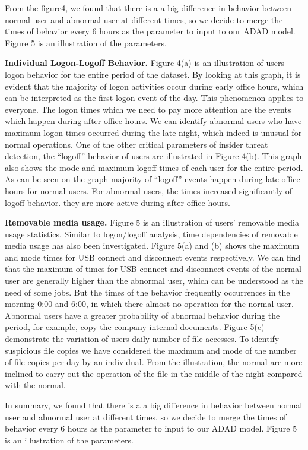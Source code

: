 \documentclass[conference]{IEEEtran}
\begin{document}
From the figure4, we found that there is a a big difference in behavior between normal user and abnormal user at different times, so we decide to merge the times of behavior every 6 hours as the parameter to input to our ADAD model. Figure 5 is an illustration of the parameters.

\iffalse
\textbf{Individual Logon-Logoff Behavior.} Figure 4(a) is an illustration of users logon behavior for the
entire period of the dataset. By looking at this graph, it is evident that the majority of logon activities occur during early office hours, which can be interpreted as the first logon event of the day. This phenomenon applies to everyone.  The logon times which we need to pay more attention are the events which happen during after office hours. We can identify abnormal users who have maximum logon times occurred during the late night, which indeed is unusual for normal operations. One of the other critical parameters of insider threat detection, the “logoff” behavior of users are illustrated in Figure 4(b). This graph also shows the mode and maximum logoff times of each user for the entire period. As can be seen on the graph majority of “logoff” events happen during late office hours for normal users. For abnormal users, the times increased significantly of logoff behavior. they are more active during after office hours.

\textbf{Removable media usage.} Figure 5 is an illustration of users’ removable media usage statistics.
Similar to logon/logoff analysis, time dependencies of removable media usage has also been investigated. Figure 5(a) and (b) shows the maximum and mode times for USB connect and disconnect events respectively. We can find that the maximum of times for USB connect and disconnect events of the normal user are generally higher than the abnormal user, which can be understood as the need of some jobs. But the times of the behavior frequently occurrences in the morning 0:00 and 6:00, in which  there almost no operation for the normal user.  Abnormal users have a greater probability of abnormal behavior during the period, for example, copy the company internal documents.
Figure 5(c) demonstrate the variation of users daily number of file accesses. To identify suspicious file copies we have considered the maximum and mode of the number of file copies per day by an individual. From the illustration, the normal are more inclined to carry out the operation of the file in the middle of the night compared with the normal.


In summary, we found that there is a a big difference in behavior between normal user and abnormal user at different times, so we decide to merge the times of behavior every 6 hours as the parameter to input to our ADAD model. Figure 5 is an illustration of the parameters.
\end{document}
